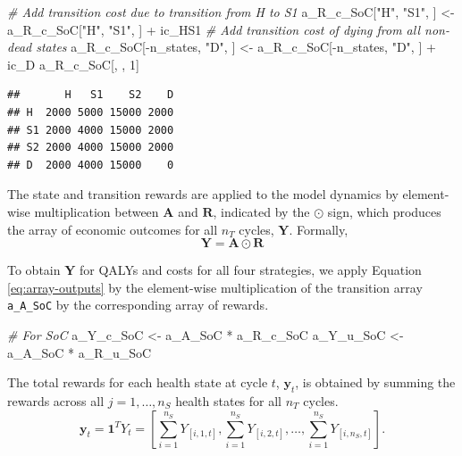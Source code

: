 \documentclass[
]{article}
\newenvironment{Shaded}{\begin{snugshade}}{\end{snugshade}}
\newcommand{\CommentTok}[1]{\textcolor[rgb]{0.56,0.35,0.01}{\textit{#1}}}
\newcommand{\DecValTok}[1]{\textcolor[rgb]{0.00,0.00,0.81}{#1}}
\newcommand{\NormalTok}[1]{#1}
\newcommand{\OtherTok}[1]{\textcolor[rgb]{0.56,0.35,0.01}{#1}}
\newcommand{\SpecialCharTok}[1]{\textcolor[rgb]{0.00,0.00,0.00}{#1}}
\newcommand{\StringTok}[1]{\textcolor[rgb]{0.31,0.60,0.02}{#1}}
\begin{document}
\begin{Shaded}
\begin{Highlighting}[]
\CommentTok{\# Add transition cost due to transition from H to S1}
\NormalTok{a\_R\_c\_SoC[}\StringTok{"H"}\NormalTok{, }\StringTok{"S1"}\NormalTok{, ] }\OtherTok{\textless{}{-}}\NormalTok{ a\_R\_c\_SoC[}\StringTok{"H"}\NormalTok{, }\StringTok{"S1"}\NormalTok{, ] }\SpecialCharTok{+}\NormalTok{ ic\_HS1}
\CommentTok{\# Add transition cost of dying from all non{-}dead states}
\NormalTok{a\_R\_c\_SoC[}\SpecialCharTok{{-}}\NormalTok{n\_states, }\StringTok{"D"}\NormalTok{, ] }\OtherTok{\textless{}{-}}\NormalTok{ a\_R\_c\_SoC[}\SpecialCharTok{{-}}\NormalTok{n\_states, }\StringTok{"D"}\NormalTok{, ] }\SpecialCharTok{+}\NormalTok{ ic\_D}
\NormalTok{a\_R\_c\_SoC[, , }\DecValTok{1}\NormalTok{]}
\end{Highlighting}
\end{Shaded}

\begin{verbatim}
##       H   S1    S2    D
## H  2000 5000 15000 2000
## S1 2000 4000 15000 2000
## S2 2000 4000 15000 2000
## D  2000 4000 15000    0
\end{verbatim}

The state and transition rewards are applied to the model dynamics by element-wise multiplication between \(\mathbf{A}\) and \(\mathbf{R}\), indicated by the \(\odot\) sign, which produces the array of economic outcomes for all \(n_T\) cycles, \(\mathbf{Y}\). Formally,
\begin{equation}
  \mathbf{Y} = \mathbf{A} \odot \mathbf{R}
  \label{eq:array-outputs}
\end{equation}

To obtain \(\mathbf{Y}\) for QALYs and costs for all four strategies, we apply Equation \eqref{eq:array-outputs} by the element-wise multiplication of the transition array \texttt{a\_A\_SoC} by the corresponding array of rewards.

\begin{Shaded}
\begin{Highlighting}[]
\CommentTok{\# For SoC}
\NormalTok{a\_Y\_c\_SoC }\OtherTok{\textless{}{-}}\NormalTok{ a\_A\_SoC }\SpecialCharTok{*}\NormalTok{ a\_R\_c\_SoC}
\NormalTok{a\_Y\_u\_SoC }\OtherTok{\textless{}{-}}\NormalTok{ a\_A\_SoC }\SpecialCharTok{*}\NormalTok{ a\_R\_u\_SoC}
\end{Highlighting}
\end{Shaded}

The total rewards for each health state at cycle \(t\), \(\mathbf{y}_t\), is obtained by summing the rewards across all \(j = 1,\ldots, n_S\) health states for all \(n_T\) cycles.
\begin{equation}
  \mathbf{y}_t = \mathbf{1}^T Y_t = \left[\sum_{i=1}^{n_S}{Y_{[i,1,t]}}, \sum_{i=1}^{n_S}{Y_{[i,2,t]}}, \dots , \sum_{i=1}^{n_S}{Y_{[i,n_S,t]}}\right].
  \label{eq:exp-rewd-trans}
\end{equation}
\end{document}
